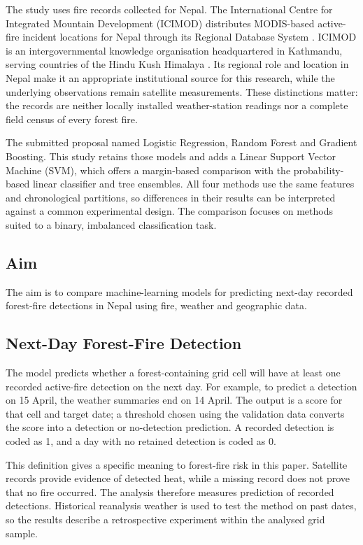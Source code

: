 \documentclass[conference,a4paper]{IEEEtran}
\begin{document}
The study uses fire records collected for Nepal. The International Centre for Integrated Mountain Development (ICIMOD) distributes MODIS-based active-fire incident locations for Nepal through its Regional Database System \citep{icimodfire}. ICIMOD is an intergovernmental knowledge organisation headquartered in Kathmandu, serving countries of the Hindu Kush Himalaya \citep{icimodabout}. Its regional role and location in Nepal make it an appropriate institutional source for this research, while the underlying observations remain satellite measurements. These distinctions matter: the records are neither locally installed weather-station readings nor a complete field census of every forest fire.

The submitted proposal named Logistic Regression, Random Forest and Gradient Boosting. This study retains those models and adds a Linear Support Vector Machine (SVM), which offers a margin-based comparison with the probability-based linear classifier and tree ensembles. All four methods use the same features and chronological partitions, so differences in their results can be interpreted against a common experimental design. The comparison focuses on methods suited to a binary, imbalanced classification task.

\subsection{Aim}
The aim is to compare machine-learning models for predicting next-day recorded forest-fire detections in Nepal using fire, weather and geographic data.

\subsection{Next-Day Forest-Fire Detection}
The model predicts whether a forest-containing grid cell will have at least one recorded active-fire detection on the next day. For example, to predict a detection on 15 April, the weather summaries end on 14 April. The output is a score for that cell and target date; a threshold chosen using the validation data converts the score into a detection or no-detection prediction. A recorded detection is coded as 1, and a day with no retained detection is coded as 0.

This definition gives a specific meaning to forest-fire risk in this paper. Satellite records provide evidence of detected heat, while a missing record does not prove that no fire occurred. The analysis therefore measures prediction of recorded detections. Historical reanalysis weather is used to test the method on past dates, so the results describe a retrospective experiment within the analysed grid sample.
\end{document}

